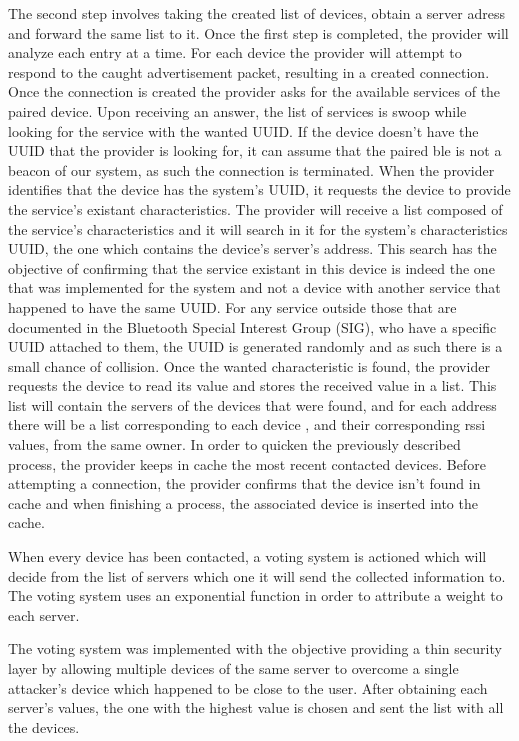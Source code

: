 \documentclass[a4paper]{IEEEtran}
\begin{document}
The second step involves taking the created list of devices, obtain a server adress and forward the same list to it. Once the first step is completed, the provider will analyze each entry at a time. For each device the provider will attempt to respond to the caught advertisement packet, resulting in a created connection.  Once the connection is created the provider asks for the available services of the paired device. Upon receiving an answer, the list of services is swoop while looking for the service with the wanted UUID. If the device doesn't have the UUID that the provider is looking for, it can assume that the paired ble is not a beacon of our system, as such the connection is terminated. When the provider identifies that the device has the system's UUID, it requests the device to provide the service's existant characteristics. The provider will receive a list composed of the service's characteristics and it will search in it for the system's characteristics UUID, the one which contains the device's server's address. This search has the objective of confirming that the service existant in this device is indeed the one that was implemented for the system and not a device with another service that happened to have the same UUID. For any service outside those that are documented in the Bluetooth Special Interest Group (SIG), who have a specific UUID attached to them, the UUID is generated randomly and as such there is a small chance of collision. Once the wanted characteristic is found, the provider requests the device to read its value and stores the received value in a list. This list will contain the servers of the devices that were found, and for each address there will be a list corresponding to each device , and their corresponding rssi values, from the same owner. In order to quicken the previously described process, the provider keeps in cache the most recent contacted devices. Before attempting a connection, the provider confirms that the device isn't found in cache and when finishing a process, the associated device is inserted into the cache.

When every device has been contacted, a voting system is actioned which will decide from the list of servers which one it will send the collected information to. The voting system uses an exponential function in order to attribute a weight to each server. 


The voting system was implemented with the objective providing a thin security layer by allowing multiple devices of the same server to overcome a single attacker's device which happened to be close to the user. After obtaining each server's values, the one with the highest value is chosen and sent the list with all the devices. 
\end{document}
